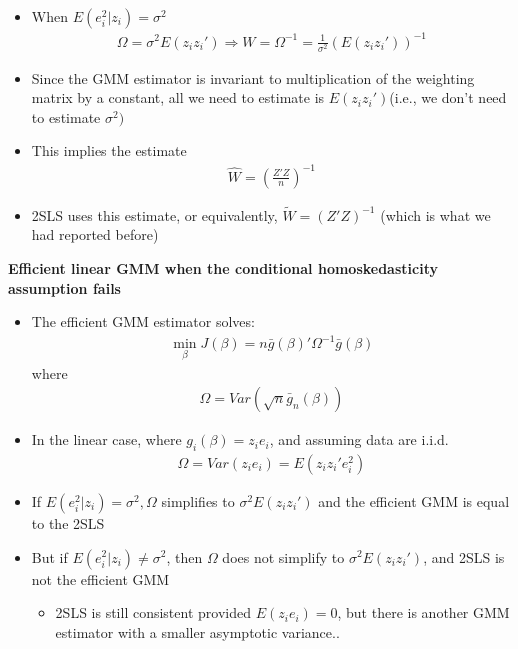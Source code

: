 \documentclass[a4paper,twoside,11pt]{article}
\begin{document}
\begin{itemize}
    \item When $E(e_i^2|z_i)=\sigma^2$
\begin{equation*}
\begin{aligned}
\Omega = \sigma^2 E(z_iz_i') \Rightarrow W = \Omega^{-1} = \frac{1}{\sigma^2} (E(z_iz_i'))^{-1}
\end{aligned} 
\end{equation*}
    \item Since the GMM estimator is invariant to multiplication of the weighting matrix by a constant, all we need to estimate is $E(z_iz_i')$(i.e., we don't need to estimate $\sigma^2)$
    \item This implies the estimate
\begin{equation*}
\begin{aligned}
\hat{W} = (\frac{Z'Z}{n})^{-1}
\end{aligned} 
\end{equation*}
    \item 2SLS uses this estimate, or equivalently, $\tilde{W}=(Z'Z)^{-1}$ (which is what we had reported before)
\end{itemize}
\textbf{Efficient linear GMM when the conditional homoskedasticity assumption fails}
\begin{itemize}
    \item The efficient GMM estimator solves:
\begin{equation*}
\begin{aligned}
\underset{\beta}{\min} J(\beta) = n \bar g(\beta)' \Omega^{-1} \bar g(\beta)
\end{aligned} 
\end{equation*}
where
\begin{equation*}
\begin{aligned}
\Omega = Var(\sqrt{n} \bar g_n (\beta)) 
\end{aligned} 
\end{equation*}
    \item In the linear case, where $g_i (\beta) = z_i e_i$, and assuming data are i.i.d.
\begin{equation*}
\begin{aligned}
\Omega = Var(z_ie_i) = E(z_iz_i'e_i^2)
\end{aligned} 
\end{equation*}
    \item If $E(e_i^2|z_i)=\sigma^2, \Omega$ simplifies to $\sigma^2 E(z_i z_i')$ and the efficient GMM is equal to the 2SLS
    \item But if $E(e_i^2|z_i) \ne \sigma^2$, then $\Omega$ does not simplify to $\sigma^2 E(z_iz_i')$, and 2SLS is not the efficient GMM
    \begin{itemize}
        \item 2SLS is still consistent provided $E (z_i e_i ) = 0$, but there is another GMM estimator with a smaller asymptotic variance..
    \end{itemize}
\end{itemize}
\end{document}
